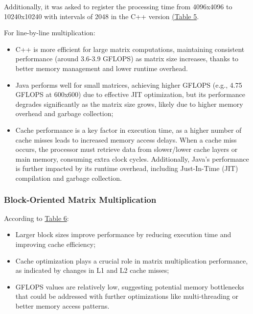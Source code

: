 \documentclass{article}
\begin{document}
Additionally, it was asked to register the processing time from 4096x4096 to 10240x10240 with intervals of 2048 in the C++ version \href{https://docs.google.com/document/d/1E8KPoQWMwUetj-bHXUUAothTzyv35YMWbAajiGcYC3A/edit?usp=sharing}{(Table 5}.

For line-by-line multiplication:

\begin{itemize}
    \item C++ is more efficient for large matrix computations, maintaining consistent performance (around 3.6-3.9 GFLOPS) as matrix size increases, thanks to better memory management and lower runtime overhead.
    \item Java performs well for small matrices, achieving higher GFLOPS (e.g., 4.75 GFLOPS at 600x600) due to effective JIT optimization, but its performance degrades significantly as the matrix size grows, likely due to higher memory overhead and garbage collection;
    \item Cache performance is a key factor in execution time, as a higher number of cache misses leads to increased memory access delays. When a cache miss occurs, the processor must retrieve data from slower/lower cache layers or main memory, consuming extra clock cycles. Additionally, Java's performance is further impacted by its runtime overhead, including Just-In-Time (JIT) compilation and garbage collection.
\end{itemize}

\subsubsection{Block-Oriented Matrix Multiplication}

According to \href{https://docs.google.com/document/d/1E8KPoQWMwUetj-bHXUUAothTzyv35YMWbAajiGcYC3A/edit?usp=sharing}{Table 6}:

\begin{itemize}
    \item Larger block sizes improve performance by reducing execution time and improving cache efficiency;
    \item Cache optimization plays a crucial role in matrix multiplication performance, as indicated by changes in L1 and L2 cache misses;
    \item GFLOPS values are relatively low, suggesting potential memory bottlenecks that could be addressed with further optimizations like multi-threading or better memory access patterns.
\end{itemize}
\end{document}
